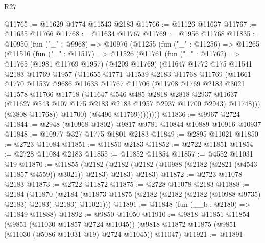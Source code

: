 \begin{lexlean}{R27}
\begin{coremodule}
@11765 := @11629 @1774 @11543 @2183
@11766 := @11126 @11637
@11767 := @11635 @11766
@11768 := @11634 @11767
@11769 := @1956 @11768
@11835 := @10950
    (fun ("_" : @9968) =>
    @10976
      (@11255
        (fun ("_" : @11256) =>
        @11265
          (@11516
            (fun ("_" : @11517) =>
            @11526
              (@11761
                (fun ("_" : @11762) =>
                @11765
                  (@1981 @11769 @1957)
                  (@4209 @11769)
                  (@11647
                    @1772
                    @175
                    @11541
                    @2183
                    @11769
                    @1957
                    (@11655
                      @1771
                      @11539
                      @2183
                      @11768
                      @11769
                      (@11661
                        @1770
                        @11537
                        @9686
                        @11633
                        @11767
                        @11706
                        (@11708
                          @1769
                          @2183
                          @3021
                          @11578
                          @11766
                          @11718
                          (@11647
                            @546
                            @485
                            @2818
                            @2818
                            @2937
                            @11637
                            (@11627 @543 @107 @175 @2183 @2183 @1957 @2937 @11700 @2943)
                            @11748)))
                      (@3808 @11768))
                    @11700)
                  (@4496 @11769))))))))
@11836 := @9967 @2724
@11844 := @2948 (@10968 @1802) @9817 @9781 @10844 @10889 @10916 @10937
@11848 := @10977 @327 @1775 @1801 @2183
@11849 := @2895 @11021
@11850 := @2723 @11084
@11851 := @11850 @2183
@11852 := @2722 @11851
@11854 := @2728 @11084 @2183
@11855 := @11852 @11854
@11857 := @4552 @11031 @19
@11870 := @11855
    (@2182 (@2182 (@2182 (@10988 (@2182 (@2821 (@4543 @11857 @4559)) @3021)) @2183) @2183) @2183)
@11872 := @2723 @11078 @2183
@11873 := @2722 @11872
@11875 := @2728 @11078 @2183
@11888 := @2184
    (@11870 (@2184 (@11873 @11875 (@2182 (@2182 (@2182 (@10988 @9735) @2183) @2183) @2183) @11021)))
@11891 := @11848 (fun (__b : @2180) => @11849 @11888)
@11892 := @9850 @11050
@11910 := @9818
    @11851
    @11854
    (@9851 (@11030 @11857 @2724 @11045))
    (@9818 @11872 @11875 (@9851 (@11030 (@5086 @11031 @19) @2724 @11045)) @11047)
@11921 := @11891

\end{coremodule}
\end{lexlean}
